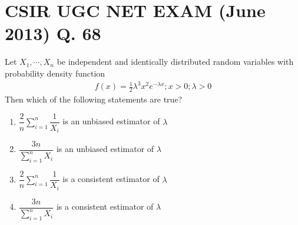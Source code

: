 \documentclass[journal,12pt,twocolumn]{IEEEtran}
\begin{document}
\section*{CSIR UGC NET EXAM (June 2013) Q. 68}
Let $ X_1, \cdots , X_n $ be independent and identically distributed random variables with probability density function
\begin{align*}
    f(x) = \frac{1}{2} \lambda^3x^2e^{-\lambda x} ; x>0 ; \lambda > 0
\end{align*}
Then which of the following statements are true?
\begin{enumerate}
    \item $\dfrac{2}{n} \sum_{i=1}^{n} \dfrac{1}{X_i} $ is an unbiased estimator of $ \lambda$
    \item $\dfrac{3n}{\sum_{i=1}^{n} X_i } $ is an unbiased estimator of $ \lambda$ \\
    \item $\dfrac{2}{n} \sum_{i=1}^{n} \dfrac{1}{X_i} $ is a consistent estimator of $ \lambda$
    \item $\dfrac{3n}{\sum_{i=1}^{n} X_i } $ is a consistent estimator of $ \lambda$
\end{enumerate}
\end{document}
